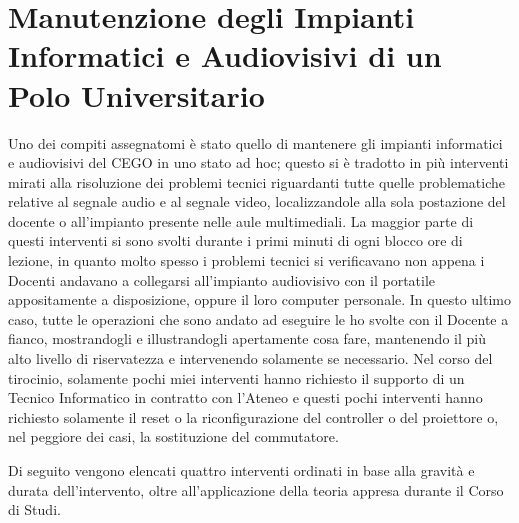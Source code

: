         \section{Manutenzione degli Impianti Informatici e Audiovisivi di un Polo Universitario}
            \par
                Uno dei compiti assegnatomi è stato quello di mantenere gli impianti informatici e audiovisivi del CEGO in uno stato ad hoc; questo si è tradotto in più interventi mirati alla risoluzione dei problemi tecnici riguardanti tutte quelle problematiche relative al segnale audio e al segnale video, localizzandole alla sola postazione del docente o all'impianto presente nelle aule multimediali. \newline
                La maggior parte di questi interventi si sono svolti durante i primi minuti di ogni blocco ore di lezione, in quanto molto spesso i problemi tecnici si verificavano non appena i Docenti andavano a collegarsi all'impianto audiovisivo con il portatile appositamente a disposizione, oppure il loro computer personale. In questo ultimo caso, tutte le operazioni che sono andato ad eseguire le ho svolte con il Docente a fianco, mostrandogli e illustrandogli apertamente cosa fare, mantenendo il più alto livello di riservatezza e intervenendo solamente se necessario. \newline
                Nel corso del tirocinio, solamente pochi miei interventi hanno richiesto il supporto di un Tecnico Informatico in contratto con l'Ateneo e questi pochi interventi hanno richiesto solamente il reset o la riconfigurazione del controller o del proiettore o, nel peggiore dei casi, la sostituzione del commutatore. 
            \par
                Di seguito vengono elencati quattro interventi ordinati in base alla gravità e durata dell'intervento, oltre all'applicazione della teoria appresa durante il Corso di Studi.
